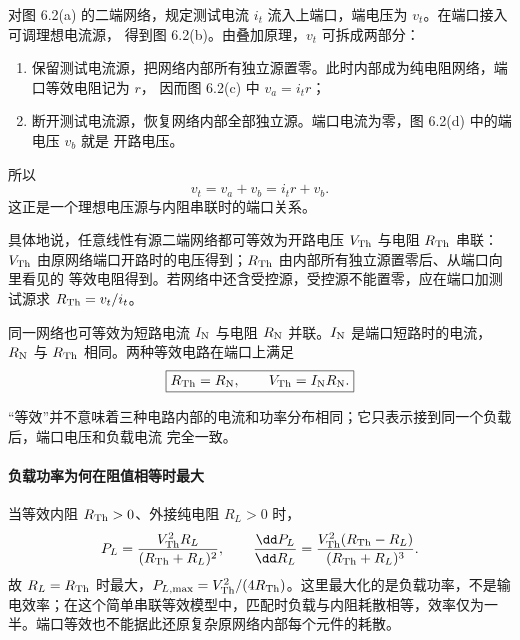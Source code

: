 对图 6.2(a) 的二端网络，规定测试电流 $i_t$ 流入上端口，端电压为 $v_t$。在端口接入可调理想电流源，
得到图 6.2(b)。由叠加原理，$v_t$ 可拆成两部分：

\begin{enumerate}
  \item 保留测试电流源，把网络内部所有独立源置零。此时内部成为纯电阻网络，端口等效电阻记为 $r$，
  因而图 6.2(c) 中 $v_a=i_t r$；
  \item 断开测试电流源，恢复网络内部全部独立源。端口电流为零，图 6.2(d) 中的端电压 $v_b$ 就是
  开路电压。
\end{enumerate}

所以
\[
  v_t=v_a+v_b=i_t r+v_b.
\]
这正是一个理想电压源与内阻串联时的端口关系。

\theveninDerivationFigure
{}

具体地说，任意线性有源二端网络都可等效为开路电压 $V_{\rm Th}$ 与电阻 $R_{\rm Th}$ 串联：
$V_{\rm Th}$ 由原网络端口开路时的电压得到；$R_{\rm Th}$ 由内部所有独立源置零后、从端口向里看见的
等效电阻得到。若网络中还含受控源，受控源不能置零，应在端口加测试源求 $R_{\rm Th}=v_t/i_t$。

同一网络也可等效为短路电流 $I_{\rm N}$ 与电阻 $R_{\rm N}$ 并联。$I_{\rm N}$ 是端口短路时的电流，
$R_{\rm N}$ 与 $R_{\rm Th}$ 相同。两种等效电路在端口上满足
\begin{equation}
  \boxed{R_{\rm Th}=R_{\rm N},\qquad V_{\rm Th}=I_{\rm N}R_{\rm N}.}
\end{equation}

\sourceEquivalenceFigure
{}

“等效”并不意味着三种电路内部的电流和功率分布相同；它只表示接到同一个负载后，端口电压和负载电流
完全一致。


\paragraph{负载功率为何在阻值相等时最大}
当等效内阻 $R_{\rm Th}>0$、外接纯电阻 $R_L>0$ 时，
\[
 P_L=\frac{V_{\rm Th}^2R_L}{(R_{\rm Th}+R_L)^2},\qquad
 \frac{\dd P_L}{\dd R_L}
 =\frac{V_{\rm Th}^2(R_{\rm Th}-R_L)}{(R_{\rm Th}+R_L)^3}.
\]
故 $R_L=R_{\rm Th}$ 时最大，$P_{L,\max}=V_{\rm Th}^2/(4R_{\rm Th})$。这里最大化的是负载功率，不是输电效率；在这个简单串联等效模型中，匹配时负载与内阻耗散相等，效率仅为一半。端口等效也不能据此还原复杂原网络内部每个元件的耗散。

